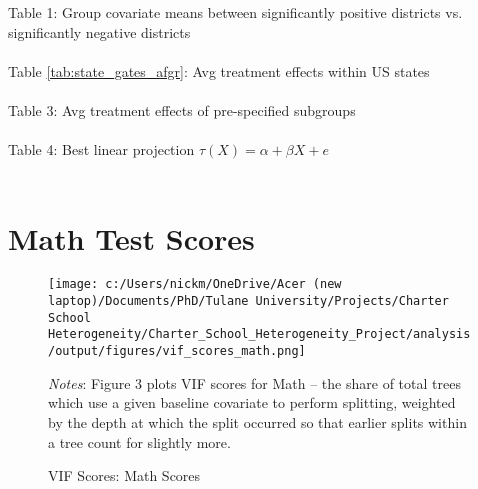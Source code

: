 \documentclass{article} %
\begin{document}
	

Table 1: Group covariate means between significantly positive districts vs. significantly negative districts\\
\\

Table \ref{tab:state_gates_afgr}: Avg treatment effects within US states\\
\\


Table 3: Avg treatment effects of pre-specified subgroups\\
\\

Table 4: Best linear projection $\tau(X) = \alpha + \beta X + e$\\
\\




	\section{Math Test Scores}

\begin{figure}[H]
\centering
\texttt{[image: c:/Users/nickm/OneDrive/Acer (new laptop)/Documents/PhD/Tulane University/Projects/Charter School Heterogeneity/Charter\_School\_Heterogeneity\_Project/analysis/output/figures/vif\_scores\_math.png]}
\caption{VIF Scores: Math Scores}
\label{fig:image3}
\begin{minipage}{1\linewidth}
\singlespacing
\footnotesize
\emph{Notes}: Figure 3 plots VIF scores for Math -- the share of total trees which use a given baseline covariate to perform splitting, weighted by the depth at which the split occurred so that earlier splits within a tree count for slightly more.  
\end{minipage}
\end{figure}
\end{document}
